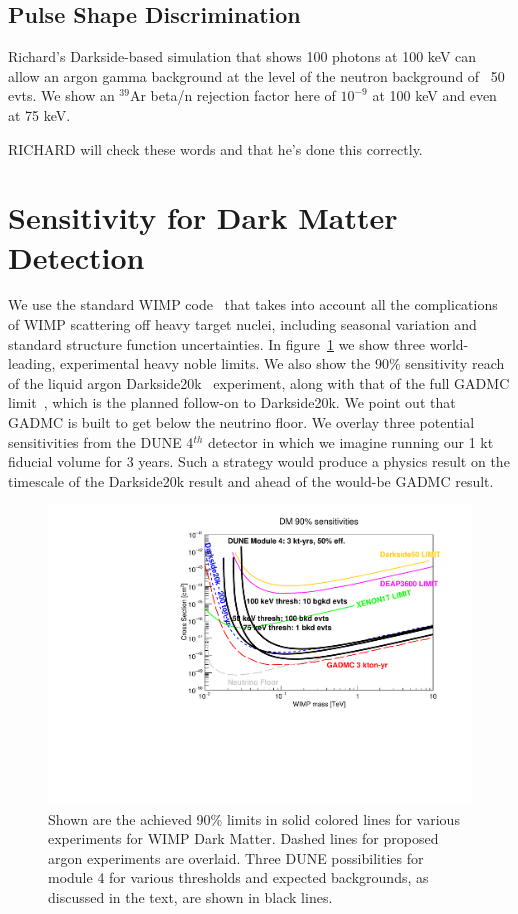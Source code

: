 \documentclass[a4paper,11pt]{article}
\begin{document}
\subsection{Pulse Shape Discrimination}
Richard's Darkside-based simulation that shows 100 photons at 100 keV can allow an argon gamma background at the level of the neutron background of ~50 evts. We show an $^{39}$Ar beta/n rejection factor here of $10^{-9}$ at 100 keV and even at 75 keV.

RICHARD will check these words and that he's done this correctly.

\section{Sensitivity for Dark Matter Detection}

We use the standard WIMP code~\cite{loer-code} that takes into account all the complications of WIMP scattering off heavy target nuclei, including seasonal variation and standard structure function uncertainties. In figure~\ref{fig:Sensitivity} we show three world-leading, experimental heavy noble limits. We also show the 90\% sensitivity reach of the liquid argon  Darkside20k~\cite{darkside20k} experiment, along with that of the full GADMC limit~\cite{gadmc}, which is the planned follow-on to Darkside20k. We point out that GADMC is built to get below the neutrino floor. We overlay three potential sensitivities from the DUNE 4$^{th}$ detector in which we imagine running our 1 kt fiducial volume for 3 years. Such a strategy would produce a physics result on the timescale of the Darkside20k result and ahead of the would-be GADMC result.


\begin{figure}[t]
\begin{centering}
\includegraphics[width=0.90\columnwidth]{Figures/paper_placeholder.pdf}
\par\end{centering}

\caption{Shown are the achieved 90\% limits in solid colored lines for various experiments for WIMP Dark Matter. Dashed lines for proposed argon experiments are overlaid. Three DUNE possibilities for module 4 for various thresholds and expected backgrounds, as discussed in the text, are shown in black lines. \label{fig:Sensitivity}}
\end{figure}
\end{document}
